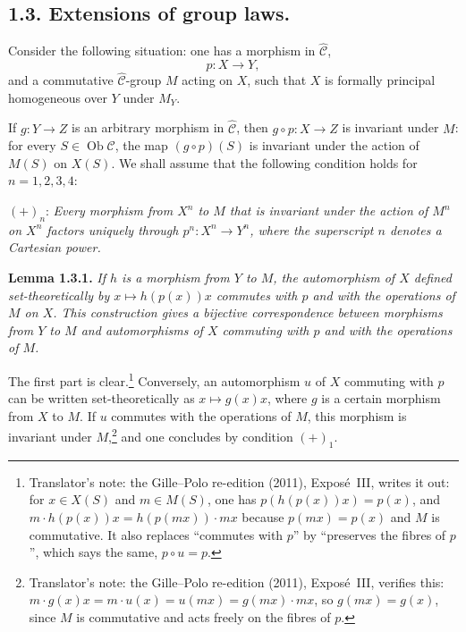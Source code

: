 

\subsection*{1.3. Extensions of group laws.}
Consider the following situation: one has a morphism in
\(\widehat{\mathscr C}\),
\[
 p:X\longrightarrow Y,
\]
and a commutative \(\widehat{\mathscr C}\)-group \(M\) acting on
\(X\), such that \(X\) is formally principal homogeneous over \(Y\)
under \(M_Y\).

If \(g:Y\to Z\) is an arbitrary morphism in
\(\widehat{\mathscr C}\), then \(g\circ p:X\to Z\) is invariant
under \(M\): for every \(S\in\operatorname{Ob}\mathscr C\), the map
\((g\circ p)(S)\) is invariant under the action of \(M(S)\) on
\(X(S)\). We shall assume that the following condition
holds for \(n=1,2,3,4\):

\medskip
\noindent\((+)_{n}\): \textit{Every morphism from \(X^n\) to \(M\)
that is invariant under the action of \(M^n\) on \(X^n\) factors
uniquely through \(p^n:X^n\to Y^n\), where the superscript \(n\)
denotes a Cartesian power.}

\medskip
\noindent{}\textbf{Lemma 1.3.1.}
\textit{If \(h\) is a morphism from \(Y\) to \(M\), the automorphism of \(X\)
defined set-theoretically by \(x\mapsto h(p(x))x\) commutes with \(p\) and
with the operations of \(M\) on \(X\). This construction gives a bijective
correspondence between morphisms from \(Y\) to \(M\) and automorphisms of
\(X\) commuting with \(p\) and with the operations of \(M\).}

The first part is clear.\footnote{Translator's note: the Gille--Polo re-edition (2011), Exposé~III, writes it out: for
\(x\in X(S)\) and \(m\in M(S)\), one has \(p(h(p(x))x)=p(x)\), and
\(m\cdot h(p(x))x=h(p(mx))\cdot mx\) because \(p(mx)=p(x)\) and \(M\) is
commutative. It also replaces ``commutes with \(p\)'' by ``preserves the
fibres of \(p\)'', which says the same, \(p\circ u=p\).} Conversely, an
automorphism \(u\) of \(X\) commuting with \(p\) can be written
set-theoretically as \(x\mapsto g(x)x\), where \(g\) is a certain morphism
from \(X\) to \(M\). If \(u\) commutes with the operations of \(M\), this
morphism is invariant under \(M\),\footnote{Translator's note: the Gille--Polo re-edition (2011), Exposé~III, verifies this:
\(m\cdot g(x)x=m\cdot u(x)=u(mx)=g(mx)\cdot mx\), so \(g(mx)=g(x)\), since
\(M\) is commutative and acts freely on the fibres of \(p\).} and one
concludes by condition \((+)_{1}\).

